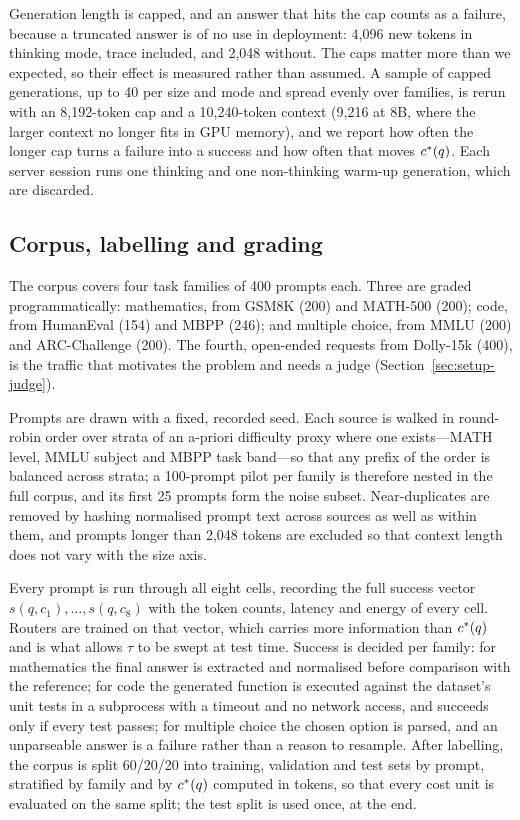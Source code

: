 Generation length is capped, and an answer that hits the cap counts as a
failure, because a truncated answer is of no use in deployment: 4{,}096 new
tokens in thinking mode, trace included, and 2{,}048 without. The caps matter
more than we expected, so their effect is measured rather than assumed. A
sample of capped generations, up to 40 per size and mode and spread evenly
over families, is rerun with an 8{,}192-token cap and a 10{,}240-token
context (9{,}216 at 8B, where the larger context no longer fits in GPU
memory), and we report how often the longer cap turns a failure into a
success and how often that moves $c^{*}(q)$. Each server session runs one
thinking and one non-thinking warm-up generation, which are discarded.

\subsection{Corpus, labelling and grading}
\label{sec:setup-labels}

The corpus covers four task families of 400 prompts each. Three are graded
programmatically: mathematics, from GSM8K \cite{cobbe2021gsm8k} (200) and
MATH-500 \cite{hendrycks2021math,lightman2024verify} (200); code, from
HumanEval \cite{chen2021humaneval} (154) and MBPP \cite{austin2021mbpp} (246);
and multiple choice, from MMLU \cite{hendrycks2021mmlu} (200) and
ARC-Challenge \cite{clark2018arc} (200). The fourth, open-ended requests from
Dolly-15k \cite{conover2023dolly} (400), is the traffic that motivates the
problem and needs a judge (Section~\ref{sec:setup-judge}).

Prompts are drawn with a fixed, recorded seed. Each source is walked in
round-robin order over strata of an a-priori difficulty proxy where one
exists---MATH level, MMLU subject and MBPP task band---so that any prefix of
the order is balanced across strata; a 100-prompt pilot per family is
therefore nested in the full corpus, and its first 25 prompts form the noise
subset. Near-duplicates are removed by hashing normalised prompt text across
sources as well as within them, and prompts longer than 2{,}048 tokens are
excluded so that context length does not vary with the size axis.

Every prompt is run through all eight cells, recording the full success
vector $s(q, c_1), \dots, s(q, c_8)$ with the token counts, latency and
energy of every cell. Routers are trained on that vector, which carries more
information than $c^{*}(q)$ and is what allows $\tau$ to be swept at test
time. Success is decided per family: for mathematics the final answer is
extracted and normalised before comparison with the reference; for code the
generated function is executed against the dataset's unit tests in a
subprocess with a timeout and no network access, and succeeds only if every
test passes; for multiple choice the chosen option is parsed, and an
unparseable answer is a failure rather than a reason to resample. After
labelling, the corpus is split 60/20/20 into training, validation and test
sets by prompt, stratified by family and by $c^{*}(q)$ computed in tokens,
so that every cost unit is evaluated on the same split; the test split is
used once, at the end.


